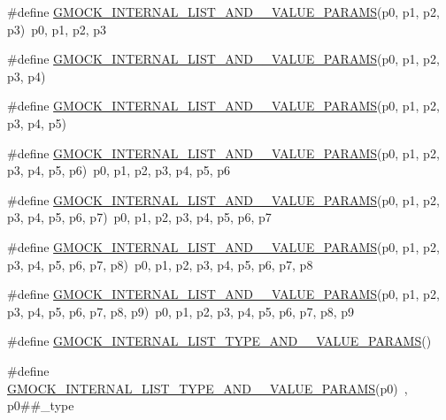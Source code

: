 \begin{DoxyCompactItemize}
\#define \hyperlink{gmock-generated-actions_8h_a8df889711a5f99ed76736a2bc5030cf2}{G\+M\+O\+C\+K\+\_\+\+I\+N\+T\+E\+R\+N\+A\+L\+\_\+\+L\+I\+S\+T\+\_\+\+A\+N\+D\+\_\+\_\+\+V\+A\+L\+U\+E\+\_\+\+P\+A\+R\+A\+MS}(p0,  p1,  p2,  p3)~p0, p1, p2, p3
\item 
\#define \hyperlink{gmock-generated-actions_8h_a4bfd52ebc75b6da1a84e5a59e12995fe}{G\+M\+O\+C\+K\+\_\+\+I\+N\+T\+E\+R\+N\+A\+L\+\_\+\+L\+I\+S\+T\+\_\+\+A\+N\+D\+\_\+\_\+\+V\+A\+L\+U\+E\+\_\+\+P\+A\+R\+A\+MS}(p0,  p1,  p2,  p3,  p4)
\item 
\#define \hyperlink{gmock-generated-actions_8h_a553114b6d5e3f751a9f122fb71a3abdb}{G\+M\+O\+C\+K\+\_\+\+I\+N\+T\+E\+R\+N\+A\+L\+\_\+\+L\+I\+S\+T\+\_\+\+A\+N\+D\+\_\+\_\+\+V\+A\+L\+U\+E\+\_\+\+P\+A\+R\+A\+MS}(p0,  p1,  p2,  p3,  p4,  p5)
\item 
\#define \hyperlink{gmock-generated-actions_8h_a6a66c76963794fca308b7e2852188e06}{G\+M\+O\+C\+K\+\_\+\+I\+N\+T\+E\+R\+N\+A\+L\+\_\+\+L\+I\+S\+T\+\_\+\+A\+N\+D\+\_\+\_\+\+V\+A\+L\+U\+E\+\_\+\+P\+A\+R\+A\+MS}(p0,  p1,  p2,  p3,  p4,  p5,  p6)~p0, p1, p2, p3, p4, p5, p6
\item 
\#define \hyperlink{gmock-generated-actions_8h_af9a5e8a55b02e7afac317a2613bd29ec}{G\+M\+O\+C\+K\+\_\+\+I\+N\+T\+E\+R\+N\+A\+L\+\_\+\+L\+I\+S\+T\+\_\+\+A\+N\+D\+\_\+\_\+\+V\+A\+L\+U\+E\+\_\+\+P\+A\+R\+A\+MS}(p0,  p1,  p2,  p3,  p4,  p5,  p6,  p7)~p0, p1, p2, p3, p4, p5, p6, p7
\item 
\#define \hyperlink{gmock-generated-actions_8h_a3e91ec053856b1b3c011b71810fb0992}{G\+M\+O\+C\+K\+\_\+\+I\+N\+T\+E\+R\+N\+A\+L\+\_\+\+L\+I\+S\+T\+\_\+\+A\+N\+D\+\_\+\_\+\+V\+A\+L\+U\+E\+\_\+\+P\+A\+R\+A\+MS}(p0,  p1,  p2,  p3,  p4,  p5,  p6,  p7,  p8)~p0, p1, p2, p3, p4, p5, p6, p7, p8
\item 
\#define \hyperlink{gmock-generated-actions_8h_a4dbbb45245e68e2f0eaf65d273c8822c}{G\+M\+O\+C\+K\+\_\+\+I\+N\+T\+E\+R\+N\+A\+L\+\_\+\+L\+I\+S\+T\+\_\+\+A\+N\+D\+\_\+\_\+\+V\+A\+L\+U\+E\+\_\+\+P\+A\+R\+A\+MS}(p0,  p1,  p2,  p3,  p4,  p5,  p6,  p7,  p8,  p9)~p0, p1, p2, p3, p4, p5, p6, p7, p8, p9
\item 
\#define \hyperlink{gmock-generated-actions_8h_a76ec2981c2b6c52e3c6cdd1eba7f37ac}{G\+M\+O\+C\+K\+\_\+\+I\+N\+T\+E\+R\+N\+A\+L\+\_\+\+L\+I\+S\+T\+\_\+\+T\+Y\+P\+E\+\_\+\+A\+N\+D\+\_\+\_\+\+V\+A\+L\+U\+E\+\_\+\+P\+A\+R\+A\+MS}()
\item 
\#define \hyperlink{gmock-generated-actions_8h_aa6b8f71158f750363cbf016eb92e0865}{G\+M\+O\+C\+K\+\_\+\+I\+N\+T\+E\+R\+N\+A\+L\+\_\+\+L\+I\+S\+T\+\_\+\+T\+Y\+P\+E\+\_\+\+A\+N\+D\+\_\+\_\+\+V\+A\+L\+U\+E\+\_\+\+P\+A\+R\+A\+MS}(p0)~, p0\#\#\+\_\+type

\end{DoxyCompactItemize}
